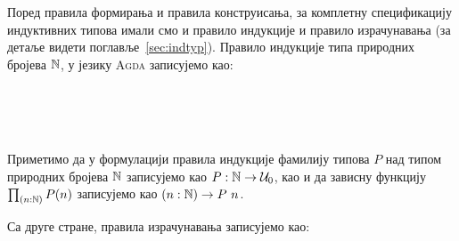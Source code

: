 Поред правила формирања и правила конструисања, за комплетну спецификацију индуктивних типова имали смо и правило индукције и правило израчунавања (за детаље видети поглавље~\ref{sec:indtyp}). Правило индукције типа природних бројева ${\mathbb{N}}$, у језику \textsc{Agda} записујемо као:
\begin{code} %
\>[0]%
\>[29I]\AgdaSymbol{:}\AgdaSpace{}%
\AgdaSymbol{(}\AgdaSpace{}%
\AgdaSymbol{:}\AgdaSpace{}%
\AgdaSpace{}%
\AgdaSpace{}%
\AgdaSpace{}%
\AgdaSpace{}%
\AgdaSymbol{)}\<%
\\
\>[.][@{}l@{}]\<[29I]%
\>[12]\AgdaSpace{}%
\AgdaSpace{}%
\<%
\\
%
\>[12]\AgdaSpace{}%
\AgdaSymbol{((}\AgdaSpace{}%
\AgdaSymbol{:}\AgdaSpace{}%
\AgdaSymbol{)}\AgdaSpace{}%
\AgdaSpace{}%
\AgdaSpace{}%
\AgdaSpace{}%
\AgdaSpace{}%
\AgdaSpace{}%
\AgdaSymbol{(}\AgdaSpace{}%
\AgdaSymbol{))}\<%
\\
%
\>[12]\AgdaSpace{}%
\AgdaSymbol{(}\AgdaSpace{}%
\AgdaSymbol{:}\AgdaSpace{}%
\AgdaSymbol{)}\AgdaSpace{}%
\AgdaSpace{}%
\AgdaSpace{}%
\<%
\end{code}
Приметимо да у формулацији правила индукције фамилију типова $P$ над типом природних бројева ${\mathbb{N}}$ записујемо као $P : {\mathbb{N}} \to \mathcal{U}_0$, као и да зависну функцију $\prod_{(n : {\mathbb{N}})} P (n)$ записујемо као $(n : {\mathbb{N}}) \to P~n$.

Са друге стране, правила израчунавања записујемо као:
\begin{code}%
\>[0]\AgdaSpace{}%
\AgdaSpace{}%
\AgdaSpace{}%
\AgdaSpace{}%
%
\>[29]\AgdaSymbol{=}\AgdaSpace{}%
\<%
\\
\>[0]\AgdaSpace{}%
\AgdaSpace{}%
\AgdaSpace{}%
\AgdaSpace{}%
\AgdaSymbol{(}\AgdaSpace{}%
\AgdaSymbol{)}\AgdaSpace{}%
\AgdaSymbol{=}\AgdaSpace{}%
\AgdaSpace{}%
\AgdaSpace{}%
\AgdaSymbol{(}\AgdaSpace{}%
\AgdaSpace{}%
\AgdaSpace{}%
\AgdaSpace{}%
\AgdaSymbol{)}\<%
\end{code}

